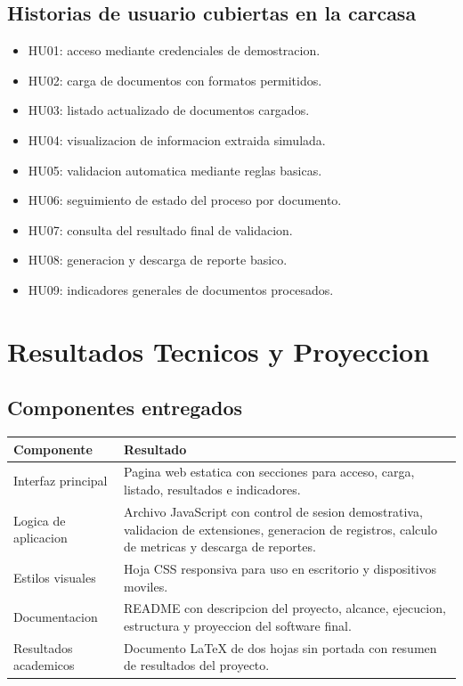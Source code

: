 \documentclass[11pt,letterpaper]{article}
\begin{document}
\subsection*{Historias de usuario cubiertas en la carcasa}

\begin{itemize}
  \item HU01: acceso mediante credenciales de demostracion.
  \item HU02: carga de documentos con formatos permitidos.
  \item HU03: listado actualizado de documentos cargados.
  \item HU04: visualizacion de informacion extraida simulada.
  \item HU05: validacion automatica mediante reglas basicas.
  \item HU06: seguimiento de estado del proceso por documento.
  \item HU07: consulta del resultado final de validacion.
  \item HU08: generacion y descarga de reporte basico.
  \item HU09: indicadores generales de documentos procesados.
\end{itemize}

\newpage

\section*{Resultados Tecnicos y Proyeccion}

\subsection*{Componentes entregados}

\begin{tabular}{p{4.2cm}p{10cm}}
\toprule
\textbf{Componente} & \textbf{Resultado} \\
\midrule
Interfaz principal & Pagina web estatica con secciones para acceso, carga, listado, resultados e indicadores. \\
Logica de aplicacion & Archivo JavaScript con control de sesion demostrativa, validacion de extensiones, generacion de registros, calculo de metricas y descarga de reportes. \\
Estilos visuales & Hoja CSS responsiva para uso en escritorio y dispositivos moviles. \\
Documentacion & README con descripcion del proyecto, alcance, ejecucion, estructura y proyeccion del software final. \\
Resultados academicos & Documento LaTeX de dos hojas sin portada con resumen de resultados del proyecto. \\
\bottomrule
\end{tabular}
\end{document}
